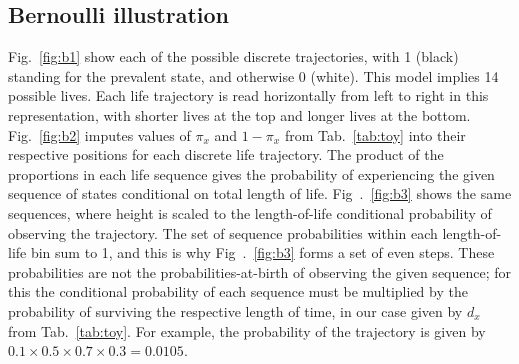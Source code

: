 \documentclass{bmcart}
\begin{document}
\subsection{Bernoulli illustration}
\label{sec:bi}
Fig.~\ref{fig:b1} show each of the possible discrete trajectories, with 1 (black) standing for the prevalent state, and otherwise 0 (white). This model implies 14 possible lives. Each life trajectory is read horizontally from left to right in this representation, with shorter lives at the top and longer lives at the bottom. Fig.~\ref{fig:b2} imputes values of $\pi_x$ and $1-\pi_x$ from Tab.~\ref{tab:toy} into their respective positions for each discrete life trajectory. The product of the proportions in each life sequence gives the probability of experiencing the given sequence of states conditional on total length of life. Fig~.~\ref{fig:b3} shows the same sequences, where height is scaled to the length-of-life conditional probability of observing the trajectory. The set of sequence probabilities within each length-of-life bin sum to 1, and this is why Fig~.~\ref{fig:b3} forms a set of even steps. These probabilities are not the probabilities-at-birth of observing the given sequence; for this the conditional probability of each sequence must be multiplied by the probability of surviving the respective length of time, in our case given by $d_x$ from Tab.~\ref{tab:toy}. For example, the probability of the  trajectory is given by $0.1\times 0.5\times 0.7\times 0.3 = 0.0105$.
\end{document}
